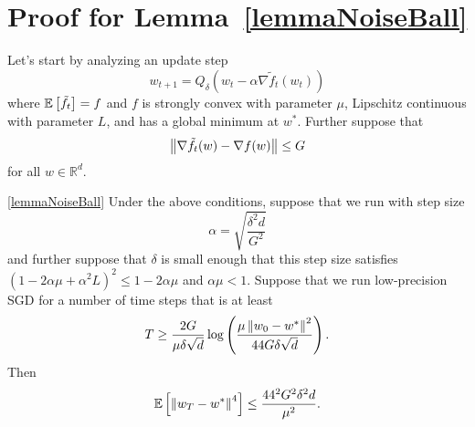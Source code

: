 

\section{Proof for Lemma~\ref{lemmaNoiseBall}}\label{sec:appendix-lemma}

Let's start by analyzing an update step
\[
  w_{t+1} = Q_{\delta}\left( w_t - \alpha \nabla \tilde f_t(w_t) \right)
\]
where $\mathbb{E}\left[ \tilde f_t \right] = f$ and $f$ is strongly convex with parameter $\mu$, Lipschitz continuous with parameter $L$, and has a global minimum at $w^*$.
Further suppose that
\[
  \left\|  \nabla \tilde f_t(w) - \nabla f(w)  \right\| \le G
\]
for all $w \in \mathbb{R}^d$.

\begin{customlemma}{\ref{lemmaNoiseBall}}
  Under the above conditions, suppose that we run with step size
  \[
    \alpha
    =
    \sqrt{ \frac{\delta^2 d}{G^2} }
  \]
  and further suppose that $\delta$ is small enough that this step size satisfies
  $(1 - 2 \alpha \mu + \alpha^2 L)^2 \le 1 - 2 \alpha \mu$ and $\alpha \mu < 1$.
  Suppose that we run low-precision SGD for a number of time steps that is at least
  \[
    T
    \ge
    \frac{2 G}{\mu \delta \sqrt{d}} \log\left( \frac{\mu \left\| w_0 - w^* \right\|^2}{44 G \delta \sqrt{d}} \right).
  \]
  Then
  \[
    \mathbb{E}\left[  \left\| w_T - w^* \right\|^4  \right]
    \le
    \frac{44^2 G^2 \delta^2 d}{\mu^2}.
  \]
  \label{lemmaNewSingleIterBound}
\end{customlemma}

